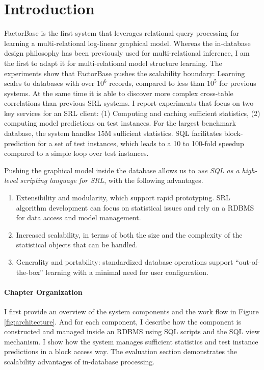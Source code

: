 \documentclass{sfuthesis}
\begin{document}
\section{Introduction} 

FactorBase  is the first system that leverages relational query processing for learning a multi-relational log-linear graphical model. Whereas the in-database design philosophy has been previously used for multi-relational inference, I am the first to adapt it for multi-relational model structure learning. 
The experiments show that FactorBase  pushes the scalability boundary: Learning scales to databases with over $10^6$ records, compared to less than $10^5$ for previous systems. At the same time it is able to discover more complex cross-table correlations than previous SRL systems. I  report experiments that focus on two key services for an SRL client: (1) Computing and caching sufficient statistics, (2) computing model predictions on test instances. For the largest benchmark database, the system handles 15M sufficient statistics. 
SQL facilitates block-prediction for a set of test instances, which leads to a 10 to 100-fold speedup compared to a simple loop over test instances.

Pushing the graphical model inside the database allows us to {\em use SQL as a high-level scripting language for SRL}, with the following advantages.

\begin{enumerate}
\item Extensibility and modularity, which support rapid prototyping. SRL algorithm development can focus on statistical issues and rely on a RDBMS for data access and model management.
\item Increased scalability, in terms of both the size and the complexity of the statistical objects that can be handled.
\item Generality and portability: standardized database operations support ``out-of-the-box'' learning with a minimal need for user configuration.
\end{enumerate}
\paragraph{Chapter Organization}
I  first provide an overview of the system components and the work flow in Figure \ref{fig:architecture}. And for each component, I  describe how the component is constructed and managed inside an RDBMS using SQL scripts and the SQL view mechanism. I  show how the system manages sufficient statistics and test instance predictions in a block access way. The evaluation section demonstrates the scalability advantages of in-database processing. 
\end{document}
